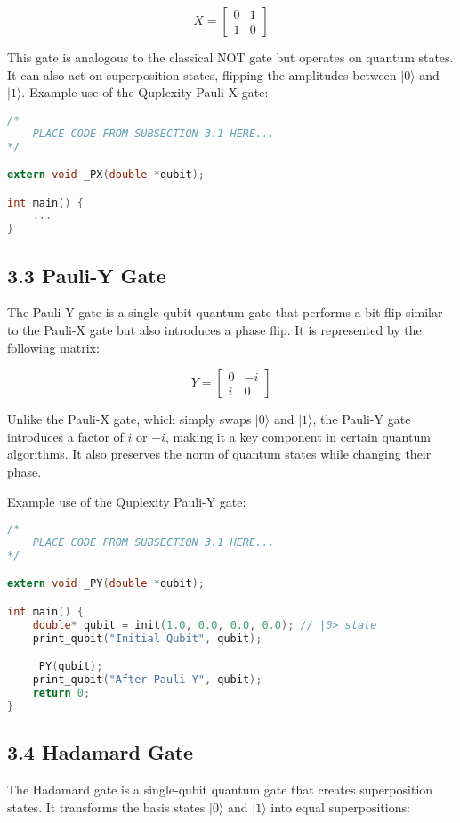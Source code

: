 \documentclass{article}
\begin{document}
\[
X = \begin{bmatrix}
0 & 1 \\
1 & 0
\end{bmatrix}
\]

This gate is analogous to the classical NOT gate but operates on quantum states. It can also act on superposition states, flipping the amplitudes between \(|0\rangle\) and \(|1\rangle\).
Example use of the Quplexity Pauli-X gate:

\begin{lstlisting}[language=C, frame=single]
/*
    PLACE CODE FROM SUBSECTION 3.1 HERE...
*/

extern void _PX(double *qubit);

int main() {
    ...
}
\end{lstlisting}

\newpage

\subsection*{3.3 Pauli-Y Gate}
The Pauli-Y gate is a single-qubit quantum gate that performs a bit-flip similar to the Pauli-X gate but also introduces a phase flip. It is represented by the following matrix:

\[
Y = \begin{bmatrix}
0 & -i \\
i & 0
\end{bmatrix}
\]

Unlike the Pauli-X gate, which simply swaps \(|0\rangle\) and \(|1\rangle\), the Pauli-Y gate introduces a factor of \(i\) or \(-i\), making it a key component in certain quantum algorithms. It also preserves the norm of quantum states while changing their phase.  

Example use of the Quplexity Pauli-Y gate:

\begin{lstlisting}[language=C, frame=single]
/*
    PLACE CODE FROM SUBSECTION 3.1 HERE...
*/

extern void _PY(double *qubit);

int main() {
    double* qubit = init(1.0, 0.0, 0.0, 0.0); // |0> state
    print_qubit("Initial Qubit", qubit);

    _PY(qubit);
    print_qubit("After Pauli-Y", qubit);
    return 0;
}
\end{lstlisting}

\subsection*{3.4 Hadamard Gate}
The Hadamard gate is a single-qubit quantum gate that creates superposition states. It transforms the basis states \(|0\rangle\) and \(|1\rangle\) into equal superpositions:
\end{document}
